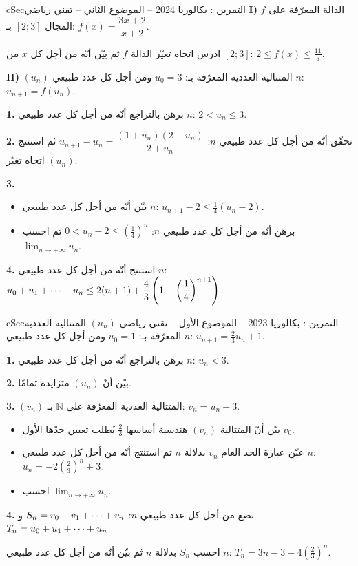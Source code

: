 \documentclass[12pt,a4paper]{article}
\newenvironment{BOX}[2]{\begin{otherlanguage}{english}\begin{arbox}{#1}{#2}}{\end{arbox}\end{otherlanguage}}
\newcounter{exo}
\newenvironment{tamrin}[1]{\stepcounter{exo}\begin{BOX}{cSec}{التمرين \theexo: #1}}{\end{BOX}}
\renewcommand{\cdots}{\mathinner{\cdotp\cdotp\cdotp}}
\newcommand{\N}{\mathbb{N}}
\newcommand{\limn}{\displaystyle\lim_{n\to+\infty}}
\newenvironment{sq}{\begin{itemize}[leftmargin=2.4em,itemsep=3pt]}{\end{itemize}}
\newcommand{\qa}{\item[(أ)]}\newcommand{\qb}{\item[(ب)]}\newcommand{\qc}{\item[(جـ)]}\newcommand{\qd}{\item[(د)]}\newcommand{\qe}{\item[(هـ)]}
\begin{document}
\begin{tamrin}{بكالوريا 2024 -- الموضوع الثاني -- تقني رياضي}
\textbf{I)} $f$ الدالة المعرّفة على المجال $[2;3]$ بـ: $f(x)=\dfrac{3x+2}{x+2}$.

ادرس اتجاه تغيّر الدالة $f$ ثم بيّن أنّه من أجل كل $x$ من $[2;3]$: $2\le f(x)\le\frac{11}{5}$.

\textbf{II)} $(u_n)$ المتتالية العددية المعرّفة بـ: $u_0=3$ ومن أجل كل عدد طبيعي $n$: $u_{n+1}=f(u_n)$.

\textbf{1.} برهن بالتراجع أنّه من أجل كل عدد طبيعي $n$: $2<u_n\le3$.

\textbf{2.} تحقّق أنّه من أجل كل عدد طبيعي $n$: $u_{n+1}-u_n=\dfrac{(1+u_n)(2-u_n)}{2+u_n}$ ثم استنتج اتجاه تغيّر $(u_n)$.

\textbf{3.}
\begin{sq}
\qa بيّن أنّه من أجل كل عدد طبيعي $n$: $u_{n+1}-2\le\frac14\left(u_n-2\right)$.
\qb برهن أنّه من أجل كل عدد طبيعي $n$: $0<u_n-2\le\left(\frac14\right)^n$ ثم احسب $\limn u_n$.
\end{sq}
\textbf{4.} استنتج أنّه من أجل كل عدد طبيعي $n$: $u_0+u_1+\cdots+u_n\le2(n+1)+\dfrac43\left(1-\left(\dfrac14\right)^{n+1}\right)$.
\end{tamrin}

\begin{tamrin}{بكالوريا 2023 -- الموضوع الأول -- تقني رياضي}
$(u_n)$ المتتالية العددية المعرّفة بـ: $u_0=1$ ومن أجل كل عدد طبيعي $n$: $u_{n+1}=\frac23u_n+1$.

\textbf{1.} برهن بالتراجع أنّه من أجل كل عدد طبيعي $n$: $u_n<3$.

\textbf{2.} بيّن أنّ $(u_n)$ متزايدة تمامًا.

\textbf{3.} $(v_n)$ المتتالية العددية المعرّفة على $\N$ بـ: $v_n=u_n-3$.
\begin{sq}
\qa بيّن أنّ المتتالية $(v_n)$ هندسية أساسها $\frac23$ يُطلب تعيين حدّها الأول $v_0$.
\qb عيّن عبارة الحد العام $v_n$ بدلالة $n$ ثم استنتج أنّه من أجل كل عدد طبيعي $n$: $u_n=-2\left(\frac23\right)^n+3$.
\qc احسب $\limn u_n$.
\end{sq}
\textbf{4.} نضع من أجل كل عدد طبيعي $n$: $S_n=v_0+v_1+\cdots+v_n$ و $T_n=u_0+u_1+\cdots+u_n$.

احسب $S_n$ بدلالة $n$ ثم بيّن أنّه من أجل كل عدد طبيعي $n$: $T_n=3n-3+4\left(\frac23\right)^n$.
\end{tamrin}
\end{document}
